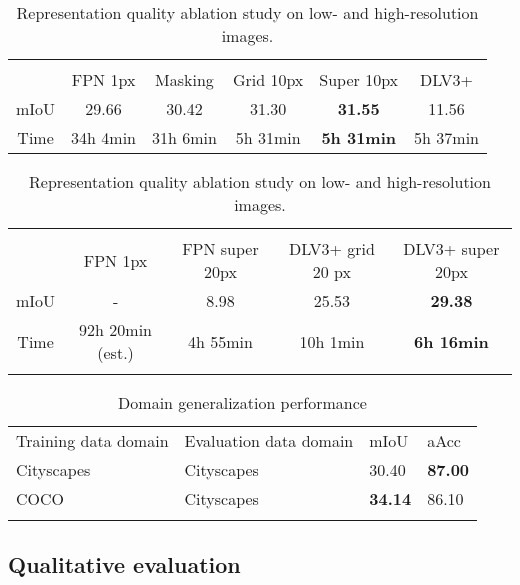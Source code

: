 \documentclass{bmvc2k}
\begin{document}
\setlength{\tabcolsep}{4pt}
\begin{table}
\begin{center}
\caption{Representation quality ablation study on low- and high-resolution images.}
\begin{tabular}{cccccc}
\hline\noalign{\smallskip}
\multicolumn{6}{c}{\textit{Low-resolution Cityscapes}} \\
     & FPN 1px & Masking & Grid 10px & Super 10px & DLV3+\\ \hline
\noalign{\smallskip}
mIoU & 29.66 & 30.42 & 31.30 & \textbf{31.55} & 11.56\\
Time & 34h 4min & 31h 6min & 5h 31min & \textbf{5h 31min} & 5h 37min\\ \hline
\end{tabular}
\begin{tabular}{ccccc}
\noalign{\smallskip}
\multicolumn{5}{c}{\textit{High-resolution Cityscapes}} \\
     & FPN 1px & FPN super 20px & DLV3+ grid 20 px & DLV3+ super 20px\\ \hline
\noalign{\smallskip}
mIoU & - & 8.98 & 25.53 & \textbf{29.38} \\ 
Time & 92h 20min (est.) & 4h 55min & 10h 1min & \textbf{6h 16min}\\ \hline
\label{tab:ablation_study}
\end{tabular}
\end{center}
\end{table}
\setlength{\tabcolsep}{1.4pt}

\setlength{\tabcolsep}{4pt}
\begin{table}
\begin{center}
\caption{Domain generalization performance}
\begin{tabular}{llll}
\hline\noalign{\smallskip}
Training data domain & Evaluation data domain & mIoU & aAcc\\
\noalign{\smallskip}\hline
Cityscapes & Cityscapes & 30.40 & \textbf{87.00}\\
COCO       & Cityscapes & \textbf{34.14} & 86.10\\
\hline
\label{tab:domain_generalization_exp}
\end{tabular}
\end{center}
\end{table}
\setlength{\tabcolsep}{1.4pt}

\subsection{Qualitative evaluation}
\end{document}
